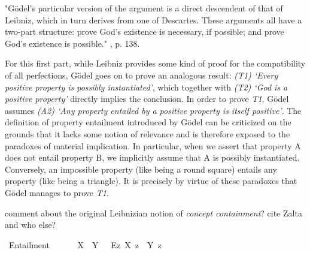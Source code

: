%
\begin{isabellebody}%
%
%
%
%
%
%
%
%
\isamarkuptrue%
%
\begin{isamarkuptext}%
"G\"odel's particular version of the argument is a direct descendent of that of Leibniz, which in turn derives
  from one of Descartes. These arguments all have a two-part structure: prove God's existence is necessary,
  if possible; and prove God's existence is possible." \cite{Fitting}, p. 138.%
\end{isamarkuptext}\isamarkuptrue%
%
\isamarkuptrue%
%
\begin{isamarkuptext}%
For this first part, while Leibniz provides some kind of proof for the compatibility of all perfections,
 G\"odel goes on to prove an analogous result: \emph{(T1) `Every positive property is possibly instantiated'},
 which together with \emph{(T2) `God is a positive property'} directly implies the conclusion.
 In order to prove \emph{T1}, G\"odel assumes \emph{(A2) `Any property entailed by a positive property is itself positive'}.
 The definition of property entailment introduced by G\"odel can be criticized on the grounds that it lacks
 some notion of relevance and is therefore exposed to the paradoxes of material implication.
 In particular, when we assert that property A does not entail property B, we implicitly assume that
 A is possibly instantiated. Conversely, an impossible property (like being a round square) entails any property
 (like being a triangle). It is precisely by virtue of these paradoxes that G\"odel manages to prove \emph{T1}.%
\end{isamarkuptext}\isamarkuptrue%
%
\begin{isamarkuptext}%
comment about the original Leibnizian notion of \emph{concept containment}? cite Zalta and who else?%
\end{isamarkuptext}\isamarkuptrue%
\isamarkupfalse%
\ Entailment{\isacharcolon}{\isacharcolon}{\isachardoublequoteopen}{\isasymup}{\isasymlangle}{\isasymup}{\isasymlangle}{\isasymzero}{\isasymrangle}{\isacharcomma}{\isasymup}{\isasymlangle}{\isasymzero}{\isasymrangle}{\isasymrangle}{\isachardoublequoteclose}\ {\isacharparenleft}\ {\isachardoublequoteopen}{\isasymRrightarrow}{\isachardoublequoteclose}\ {}{}{\isacharparenright}\ \isanewline
\ \ {\isachardoublequoteopen}X\ {\isasymRrightarrow}\ Y\ {\isasymequiv}\ \ \isactrlbold {\isasymbox}{\isacharparenleft}\isactrlbold {\isasymforall}\isactrlsup Ez{\isachardot}\ X\ z\ \isactrlbold {\isasymrightarrow}\ Y\ z{\isacharparenright}{\isachardoublequoteclose}\isanewline

\end{isabellebody}
